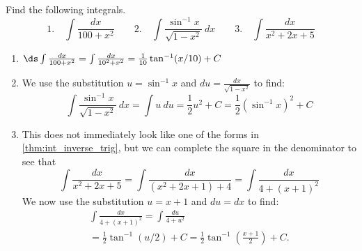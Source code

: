 \begin{example}\label{eg_inv_deriv_harder}
Find the following integrals.
\[
 \text{1.}\quad\int\frac{dx}{100+x^2}\qquad
 \text{2.}\quad\int\frac{\sin^{-1} x}{\sqrt{1-x^2}}\ dx\qquad
 \text{3.}\quad\int\frac{dx}{x^2+2x+5}
\]
\solution
\begin{enumerate}
\item $\ds\int\frac{dx}{100+x^2}=\int\frac{dx}{10^2+x^2}=\frac1{10}\tan^{-1}(x/10)+C$
\item We use the substitution $u=\sin^{-1}x$ and $du=\frac{dx}{\sqrt{1-x^2}}$ to find:
\[\int\frac{\sin^{-1}x}{\sqrt{1-x^2}}\ dx=\int u\ du=\frac12 u^2+C=\frac 12\left(\sin^{-1}x\right)^2+C\]
\item This does not immediately look like one of the forms in \autoref{thm:int_inverse_trig}, but we can complete the square in the denominator to see that
\[\int\frac{dx}{x^2+2x+5} =\int\frac{dx}{(x^2+2x+1)+4}=\int\frac{dx}{4+(x+1)^2}\]
We now use the substitution $u=x+1$ and $du=dx$ to find:
\begin{multline*}
 \int\frac{dx}{4+(x+1)^2} =\int\frac{du}{4+u^2}\\
 =\frac12 \tan^{-1}(u/2)+C =\frac 12\tan^{-1}\left(\frac{x+1}2\right)+C.
\end{multline*}
\end{enumerate}
\end{example}

